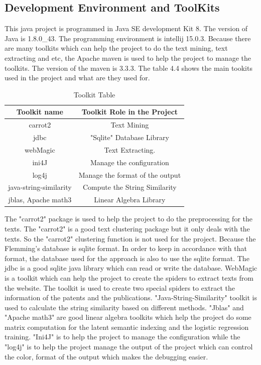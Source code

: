 \subsection{Development Environment and ToolKits}
This java project is programmed in Java SE development Kit 8. The version of Java is 1.8.0\_43. The programming environment is intellij 15.0.3. Because there are many toolkits which can help the project to do the text mining, text extracting and etc, the Apache maven is used to help the project to manage the toolkits. The version of the maven is 3.3.3. The table 4.4 shows the main tookits used in the project and what are they used for.  

\begin{table}[b]
\centering

\begin{tabular}{|c|c|}
\hline
Toolkit name & Toolkit Role in the Project \\
\hline
carrot2 & Text Mining \\
\hline
jdbc  & "Sqlite" Database Library \\ 
\hline
webMagic & Text Extracting.\\
\hline
ini4J& Manage the configuration \\
\hline
log4j & Manage the format of the output \\
\hline
java-string-similarity & Compute the String Similarity \\
\hline
jblas, Apache math3 & Linear Algebra Library \\
\hline

\end{tabular}

\caption{Toolkit Table}
\end{table}

The "carrot2" package is used to help the project to do the preprocessing for the texts. The "carrot2" is a good text clustering package but it only deals with the texts. So the "carrot2" clustering function is not used for the project. Because the Flemming's database is sqlite format. In order to keep in accordance with that format, the database used for the approach is also to use the sqlite format. The jdbc is a good sqlite java library which can read or write the database. WebMagic is a toolkit which can help the project to create the spiders to extract texts from the website. The toolkit is used to create two special spiders to extract the information of the patents and the publications. "Java-String-Similarity" toolkit is used to calculate the string similarity based on different methods. "Jblas" and "Apache math3" are good linear algebra toolkits which help the project do some matrix computation for the latent semantic indexing and the logistic regression training. "Ini4J" is to help the project to manage the configuration while the "log4j" is to help the project manage the output of the project which can control the color, format of the output which makes the debugging easier. 

